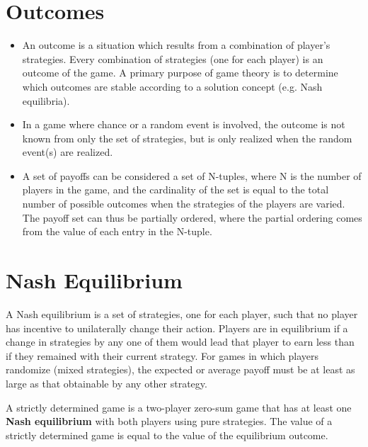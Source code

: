 \documentclass[]{report}
\begin{document}

\section{Outcomes}
\begin{itemize}
\item An outcome is a situation which results from a combination of player's strategies. Every combination of strategies (one for each player) is an outcome of the game. A primary purpose of game theory is to determine which outcomes are stable according to a solution concept (e.g. Nash equilibria).
\item 
In a game where chance or a random event is involved, the outcome is not known from only the set of strategies, but is only realized when the random event(s) are realized.
\item 
A set of payoffs can be considered a set of N-tuples, where N is the number of players in the game, and the cardinality of the set is equal to the total number of possible outcomes when the strategies of the players are varied. The payoff set can thus be partially ordered, where the partial ordering comes from the value of each entry in the N-tuple. 
\end{itemize}
\section{Nash Equilibrium}
A Nash equilibrium is a set of strategies, one for each player, such that no player has incentive to unilaterally change their action. Players are in equilibrium if a change in strategies by any one of them would lead that player to earn less than if they remained with their current strategy. For games in which players randomize (mixed strategies), the expected or average payoff must be at least as large as that obtainable by any other strategy.

A strictly determined game is a two-player zero-sum game that has at least one \textbf{Nash equilibrium} with both players using pure strategies. The value of a strictly determined game is equal to the value of the equilibrium outcome.
\end{document}

